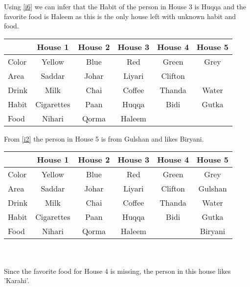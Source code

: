\documentclass[a4paper]{exam}
\newcommand\cb{\color{blue}}
\begin{document}
\begin{questions}
\begin{solution}
    Using \ref{i6} we can infer that the Habit of the person in House 3 is Huqqa and the favorite food is Haleem as this is the only house left with unknown habit and food.\\ 
    \begin{tabular}{l||*5{c|}}
      & \textbf{House 1} & \textbf{\cb House 2} & \textbf{House 3} & \textbf{House 4} & \textbf{House 5} \\
      \hline\hline
      Color & Yellow & Blue & Red & Green & Grey \\\hline
      Area & Saddar & Johar & Liyari & Clifton & \\\hline
      Drink & Milk & Chai & Coffee & Thanda & Water \\\hline
      Habit & Cigarettes & Paan & Huqqa & Bidi & Gutka \\\hline
      Food & Nihari & Qorma & Haleem & & \\\hline
    \end{tabular}

    From \ref{i2} the person in House 5 is from Gulshan and likes Biryani.\\
    \begin{tabular}{l||*5{c|}}
      & \textbf{House 1} & \textbf{\cb House 2} & \textbf{House 3} & \textbf{House 4} & \textbf{House 5} \\
      \hline\hline
      Color & Yellow & Blue & Red & Green & Grey \\\hline
      Area & Saddar & Johar & Liyari & Clifton & Gulshan \\\hline
      Drink & Milk & Chai & Coffee & Thanda & Water \\\hline
      Habit & Cigarettes & Paan & Huqqa & Bidi & Gutka \\\hline
      Food & Nihari & Qorma & Haleem & & Biryani \\\hline
    \end{tabular}
    \\\\Since the favorite food for House 4 is missing, the person in this house likes 'Karahi'.
  \end{solution}
  
\end{questions}
\end{document}
